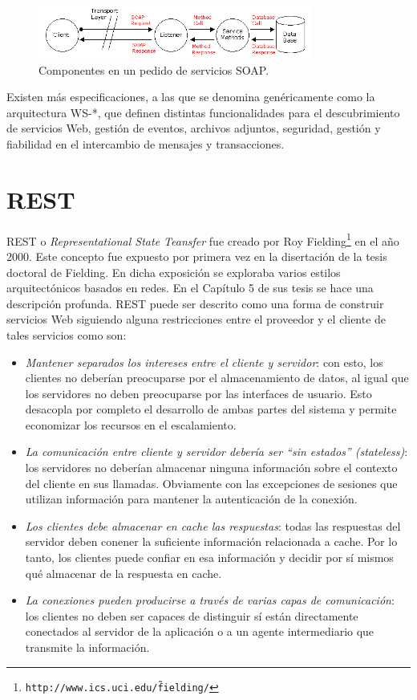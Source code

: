 \documentclass[conference]{IEEEtran}
\begin{document}
\begin{figure}[!t]
\centering
  \includegraphics[width=0.8\textwidth]{img/soap-comp}
  \caption{Componentes en un pedido de servicios SOAP.}
  \label{fig:soap-comp}
\end{figure}

Existen más especificaciones, a las que se denomina genéricamente como
la arquitectura WS-*, que definen distintas funcionalidades para el
descubrimiento de servicios Web, gestión de eventos, archivos
adjuntos, seguridad, gestión y fiabilidad en el intercambio de
mensajes y transacciones. 

\section{REST}
\label{sec:soap}

REST o \textsl{Representational State Teansfer} fue creado por Roy
Fielding\footnote{\texttt{http://www.ics.uci.edu/\~fielding/}} en el
año 2000. Este concepto fue expuesto por primera vez en la disertación
de la tesis doctoral de Fielding. En dicha exposición se exploraba
varios estilos arquitectónicos basados en redes. En el Capítulo 5
\cite{FieldingPhD} de sus tesis se hace una descripción profunda. REST
puede ser descrito como una forma de construir servicios Web siguiendo
alguna restricciones entre el proveedor y el cliente de tales
servicios como son\cite{NordicAPIs}:

\begin{itemize}
\item \emph{Mantener separados los intereses entre el cliente y
    servidor}:
  con esto, los clientes no deberían preocuparse por el almacenamiento
  de datos, al igual que los servidores no deben preocuparse por las
  interfaces de usuario. Esto desacopla por completo el desarrollo de
  ambas partes del sistema y permite economizar los recursos en el
  escalamiento. 
\item \emph{La comunicación entre cliente y servidor debería ser ``sin
  estados'' (\emph{stateless})}:  los servidores no deberían almacenar
  ninguna información sobre el contexto del cliente en sus
  llamadas. Obviamente con las excepciones de sesiones que utilizan
  información para mantener la autenticación de la conexión.
\item \emph{Los clientes debe almacenar en cache  las respuestas}:
  todas las
  respuestas del servidor deben conener la suficiente información
  relacionada a cache. Por lo tanto, los clientes puede confiar en esa
  información y decidir por sí mismos qué almacenar de la respuesta en
  cache. 
\item \emph{La conexiones pueden producirse  a través de varias capas de
  comunicación}: los clientes no deben ser capaces de distinguir sí
  están directamente conectados al servidor de la aplicación o a un
  agente intermediario que transmite la información. 
\end{itemize}
\end{document}

